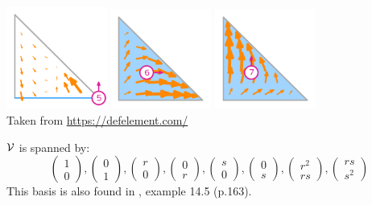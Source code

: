\begin{center}
\includegraphics[width=3.3cm]{images/pair_raviart-thomas/element-Raviart-Thomas-variant-equispaced-triangle-2-5}
\includegraphics[width=3.3cm]{images/pair_raviart-thomas/element-Raviart-Thomas-variant-equispaced-triangle-2-6}
\includegraphics[width=3.3cm]{images/pair_raviart-thomas/element-Raviart-Thomas-variant-equispaced-triangle-2-7}\\
{\captionfont Taken from \url{https://defelement.com/}}
\end{center}


${\cal V}$ is spanned by:
\[
\left( \begin{array}{c} 1 \\ 0  \end{array} \right),
\left( \begin{array}{c} 0 \\ 1  \end{array} \right),
\left( \begin{array}{c} r \\ 0  \end{array} \right),
\left( \begin{array}{c} 0 \\ r  \end{array} \right),
\left( \begin{array}{c} s \\ 0  \end{array} \right),
\left( \begin{array}{c} 0 \\ s  \end{array} \right),
\left( \begin{array}{c} r^2 \\ rs  \end{array} \right),
\left( \begin{array}{c} rs \\ s^2  \end{array} \right)
\]
This basis is also found in \cite{ergu21_72}, example 14.5 (p.163).

